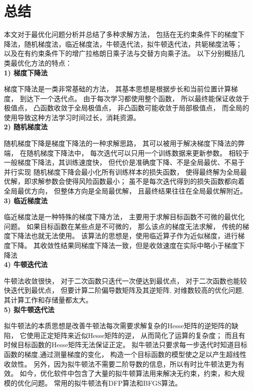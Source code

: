 \section{总结}

本文对于最优化问题分析并总结了多种求解方法，
包括在无约束条件下的梯度下降法，随机梯度法，临近梯度法，牛顿迭代法，拟牛顿迭代法，共轭梯度法等；
以及在有约束条件下的增广拉格朗日乘子法与交替方向乘子法。
以下分别概括几类最优化方法的特点：\\

\textbf{1) 梯度下降法}

梯度下降法是一类非常基础的方法，
其基本思想是根据步长和当前位置计算梯度，
到达下一个迭代点。
由于每次学习都使用整个函数，
所以最终能保证收敛于极值点，
凸函数收敛于全局极值点，
非凸函数可能收敛于局部极值点，
而全局的使用导致这种方法学习时间过长，消耗资源。\\


\textbf{2) 随机梯度法}

随机梯度下降是梯度下降法的一种求解思路，
其可以被用于解决梯度下降法的弊端，
在随机梯度下降法中，
每次迭代可以只用一个训练数据来更新参数。
相较于一般梯度下降法，其训练速度快，
但代价是准确度下降、不是全局最优、不易于并行实现
随机梯度下降会最小化所有训练样本的损失函数，
使得最终解为全局最优解，即求解参数会使得风险函数最小；
虽不是每次迭代得到的损失函数都向着全局最优方向，
但整体方向是全局最优解，
且最终结果往往在全局最优解附近。\\


\textbf{3) 临近梯度法}

临近梯度法是一种特殊的梯度下降方法，
主要用于求解目标函数不可微的最优化问题。
如果目标函数在某些点是不可微的，
那么该点的梯度无法求解，
传统的梯度下降法也就无法使用。
该算法的思想是，使用临近算子作为近似梯度，进行梯度下降。
其收敛性结果同梯度下降法一致，但是收敛速度在实际中略小于梯度下降法\\

\textbf{4) 牛顿迭代法}

牛顿法收敛很快，
对于二次函数只迭代一次便达到最优点，
对于二次函数也能较快迭代到最优点，
但要计算二阶偏导数矩阵及其逆矩阵,
对维数较高的优化问题,
其计算工作和存储量都太大。\\


\textbf{5) 拟牛顿迭代法}

拟牛顿法的本质思想是改善牛顿法每次需要求解复杂的Hesse矩阵的逆矩阵的缺陷，
它使用正定矩阵来近似Hesse矩阵的逆，
从而简化了运算的复杂度；
而且有时候目标函数的Hesse矩阵无法保证正定。
拟牛顿法只要求每一步迭代时知道目标函数的梯度,通过测量梯度的变化，
构造一个目标函数的模型使之足以产生超线性收敛性。
另外，因为拟牛顿法不需要二阶导数的信息，所以有时比牛顿法更为有效。
如今，优化软件中包含了大量的拟牛顿算法用来解决无约束，约束，和大规模的优化问题。
常用的拟牛顿法有DFP算法和BFGS算法。\\

